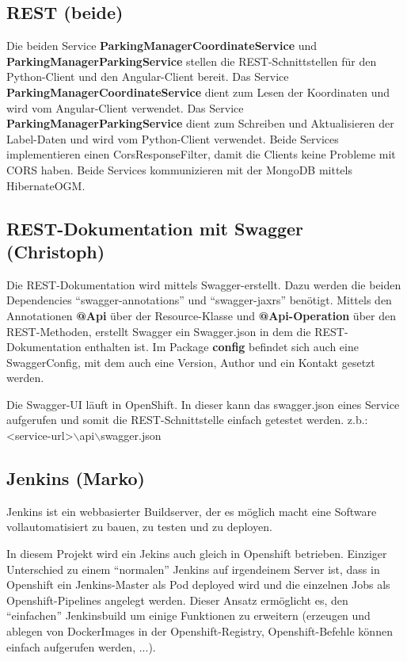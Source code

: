 \documentclass[11pt, a4paper, twoside]{article}   	%
\begin{document}
\subsection{REST (beide)}
Die beiden Service \textbf{ParkingManagerCoordinateService} und \textbf{ParkingManagerParkingService} stellen die REST-Schnittstellen für den Python-Client und den Angular-Client bereit.
Das Service \textbf{ParkingManagerCoordinateService} dient zum Lesen der Koordinaten und wird vom Angular-Client verwendet.
Das Service \textbf{ParkingManagerParkingService} dient zum Schreiben und Aktualisieren der Label-Daten und wird vom Python-Client verwendet.
Beide Services implementieren einen CorsResponseFilter, damit die Clients keine Probleme mit CORS haben.
Beide Services kommunizieren mit der MongoDB mittels HibernateOGM.

\subsection{REST-Dokumentation mit Swagger (Christoph)}
Die REST-Dokumentation wird mittels Swagger-erstellt. Dazu werden die beiden Dependencies \enquote{swagger-annotations} und \enquote{swagger-jaxrs} benötigt. Mittels den Annotationen \textbf{@Api} über der Resource-Klasse und \textbf{@Api-Operation} über den REST-Methoden, erstellt Swagger ein Swagger.json in dem die REST-Dokumentation enthalten ist.
Im Package \textbf{config} befindet sich auch eine SwaggerConfig, mit dem auch eine Version, Author und ein Kontakt gesetzt werden.

Die Swagger-UI läuft in OpenShift. In dieser kann das swagger.json eines Service aufgerufen und somit die REST-Schnittstelle einfach getestet werden.
z.b.: <service-url>$\backslash$api$\backslash$swagger.json

\subsection{Jenkins (Marko)}
Jenkins ist ein webbasierter Buildserver, der es möglich macht eine Software vollautomatisiert zu bauen, zu 
testen und zu deployen. 

In diesem Projekt wird ein Jekins auch gleich in Openshift betrieben. Einziger Unterschied zu einem \enquote{normalen}
Jenkins auf irgendeinem Server ist, dass in Openshift ein Jenkins-Master als Pod deployed wird und die einzelnen 
Jobs als Openshift-Pipelines angelegt werden. Dieser Ansatz ermöglicht es, den \enquote{einfachen} Jenkinsbuild um einige 
Funktionen zu erweitern (erzeugen und ablegen von DockerImages in der Openshift-Registry, Openshift-Befehle können 
einfach aufgerufen werden, ...). 
\end{document}
